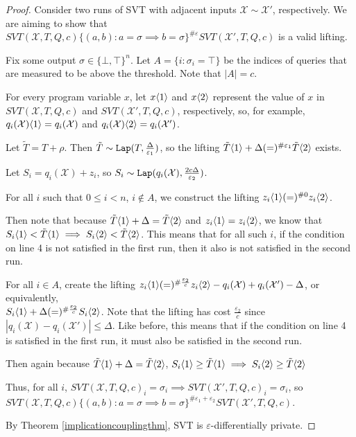 \begin{proof}
    Consider two runs of SVT with adjacent inputs $\mathcal{X}\sim\mathcal{X}'$, respectively. We are aiming to show that $SVT(\mathcal{X}, T, Q, c)\{(a, b): a=\sigma \implies b=\sigma\}^{\#\varepsilon}SVT(\mathcal{X}', T, Q, c)$ is a valid lifting. 

    Fix some output $\sigma \in \{\bot, \top\}^n$. Let $A = \{i:\sigma_i = \top\}$ be the indices of queries that are measured to be above the threshold. Note that $|A| = c$. 
    
    For every program variable $x$, let $x\langle1 \rangle$ and $x\langle2 \rangle$ represent the value of $x$ in $SVT(\mathcal{X}, T, Q, c)$ and $SVT(\mathcal{X}', T, Q, c)$, respectively, so, for example, $q_i(\mathcal{X})\langle1 \rangle = q_i(\mathcal{X})$ and $q_i(\mathcal{X})\langle2 \rangle = q_i(\mathcal{X}')$. 

    Let $\tilde{T}=T + \rho$. Then $\tilde{T} \sim \texttt{Lap}(T, \frac{\Delta}{\varepsilon_1})$, so the lifting $\tilde{T}\langle1 \rangle +\Delta (=)^{\#\varepsilon_1}\tilde{T}\langle2 \rangle$ exists. 

    Let $S_i = q_i(\mathcal{X}) + z_i$, so $S_i \sim\texttt{Lap}(q_i(\mathcal{X}), \frac{2c\Delta}{\varepsilon_2})$.

    For all $i$ such that $0\leq i < n$, $i\notin A$, we construct the lifting $z_i\langle1 \rangle (=)^{\#0}z_i\langle2 \rangle$. 

    Then note that because $\tilde{T}\langle1 \rangle+\Delta = \tilde{T}\langle2 \rangle$ and $z_i\langle1 \rangle = z_i \langle2 \rangle$, we know that $S_i\langle1 \rangle < \tilde{T}\langle1 \rangle \implies S_i\langle2 \rangle < \tilde{T}\langle2 \rangle$. This means that for all such $i$, if the condition on line 4 is not satisfied in the first run, then it also is not satisfied in the second run.

    For all $i\in A$, create the lifting $z_i\langle1 \rangle(=)^{\#\frac{\varepsilon_2}{c}}z_i\langle2 \rangle - q_i(\mathcal{X})+q_i(\mathcal{X}')-\Delta$, or equivalently, \\$S_i\langle1 \rangle +\Delta (=)^{\#\frac{\varepsilon_2}{c}} S_i\langle2 \rangle$. Note that the lifting has cost $\frac{\varepsilon_2}{c}$ since $|q_i(\mathcal{X})-q_i(\mathcal{X}')|\leq \Delta$. Like before, this means that if the condition on line 4 is satisfied in the first run, it must also be satisfied in the second run. 

    Then again because $\tilde{T}\langle1 \rangle +\Delta = \tilde{T}\langle2 \rangle$, $S_i\langle1 \rangle \geq \tilde{T}\langle1 \rangle \implies S_i\langle2 \rangle \geq \tilde{T}\langle2 \rangle$

    Thus, for all $i$, $SVT(\mathcal{X}, T, Q, c)_i = \sigma_i \implies SVT(\mathcal{X}', T, Q, c)_i = \sigma_i$, so $SVT(\mathcal{X}, T, Q, c)\{(a, b): a=\sigma \implies b=\sigma\}^{\#\varepsilon_1+\varepsilon_2}SVT(\mathcal{X}', T, Q, c)$.

    By Theorem \ref{implicationcouplingthm}, SVT is $\varepsilon$-differentially private. 
\end{proof}
